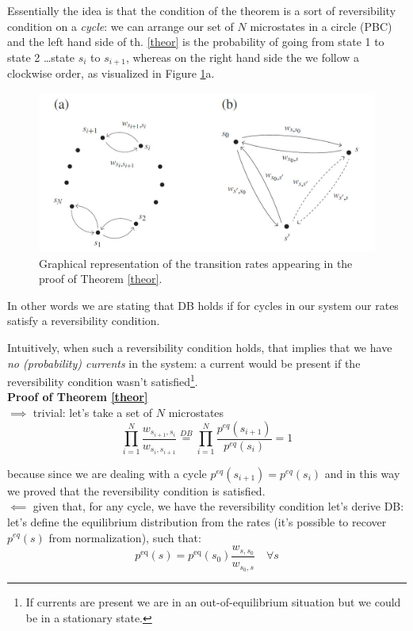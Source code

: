 \documentclass[\main/main.tex]{subfiles}
\begin{document}
Essentially the idea is that the condition of the theorem is a sort of reversibility condition on a \textit{cycle}: we can arrange our set of $N$ microstates in a circle (PBC) and the left hand side of th. \ref{theor} is the probability of going from state 1 to state 2 \dots state $s_{i}$ to $s_{i+1}$, whereas on the right hand side the we follow a clockwise order, as visualized in Figure \ref{fig:theor}a.

\begin{figure}[ht]
    \centering
    \includegraphics[width=\linewidth]{Lectures/Images/th_db.jpg}
    \caption{Graphical representation of the transition rates appearing in the proof of Theorem \ref{theor}.}
    \label{fig:theor}
\end{figure}

In other words we are stating that DB holds if for cycles in our system our rates satisfy a reversibility condition.

Intuitively, when such a reversibility condition holds, that implies that we have \textit{no (probability) currents} in the system: a current would be present if the reversibility condition wasn't satisfied\footnote{If currents are present we are in an out-of-equilibrium situation but we could be in a stationary state.}. \\

\textbf{Proof of Theorem \ref{theor}}  \\

$\boxed{\implies}$ trivial: let's take a set of $N$ microstates 
$$
\prod_{i=1}^N \frac{w_{s_{i+1},s_i}}{w_{s_{i},s_{i+1}}}\overset{DB}{=}\prod_{i=1}^N \frac{p^{eq}(s_{i+1})}{p^{eq}(s_i)}=1
$$

because since we are dealing with a cycle $p^{eq}(s_{i+1})=p^{eq}(s_i)$ and in this way we proved that the reversibility condition is satisfied. \\

$\boxed{\impliedby}$ given that, for any cycle, we have the reversibility condition let's derive DB: let's define the equilibrium distribution from the rates (it's possible to recover $p^{eq}(s)$ from normalization), such that:
\begin{equation}
\boxed{p^{\mathrm{eq}}(s) = p^{\mathrm{eq}}\left(s_{0}\right) \frac{w_{s, s_{0}}}{w_{s_{0}, s}}} \quad \forall s
\label{eq:probdistri}
\end{equation}
\end{document}
